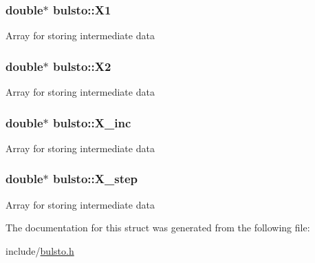 \subsubsection[{X1}]{\setlength{\rightskip}{0pt plus 5cm}double$\ast$ bulsto\+::\+X1}\label{structbulsto_ae042d246b8cc4fc2dca7eeb2b7de41a0}
Array for storing intermediate data \hypertarget{structbulsto_a07d3f69a611b1f3d346615d8936672ce}{}
\subsubsection[{X2}]{\setlength{\rightskip}{0pt plus 5cm}double$\ast$ bulsto\+::\+X2}\label{structbulsto_a07d3f69a611b1f3d346615d8936672ce}
Array for storing intermediate data \hypertarget{structbulsto_ad3ed4caf9c6fac621f0712b5162c0948}{}
\subsubsection[{X\+\_\+inc}]{\setlength{\rightskip}{0pt plus 5cm}double$\ast$ bulsto\+::\+X\+\_\+inc}\label{structbulsto_ad3ed4caf9c6fac621f0712b5162c0948}
Array for storing intermediate data \hypertarget{structbulsto_abda965d700144ad6697fb51a52c15d19}{}
\subsubsection[{X\+\_\+step}]{\setlength{\rightskip}{0pt plus 5cm}double$\ast$ bulsto\+::\+X\+\_\+step}\label{structbulsto_abda965d700144ad6697fb51a52c15d19}
Array for storing intermediate data 

The documentation for this struct was generated from the following file\+:\begin{DoxyCompactItemize}
\item 
include/\hyperlink{bulsto_8h}{bulsto.\+h}\end{DoxyCompactItemize}
